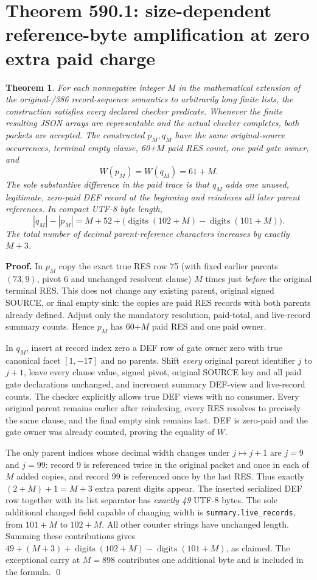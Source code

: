 \documentclass[11pt]{article}
\newtheorem{theorem}{Theorem}
\begin{document}
\section*{Theorem 590.1: size-dependent reference-byte amplification at zero extra paid charge}
\begin{theorem}
For each nonnegative integer $M$ in the mathematical extension of the original-/386 record-sequence semantics to arbitrarily long finite lists, the construction satisfies every declared checker predicate. Whenever the finite resulting JSON arrays are representable and the actual checker completes, both packets are accepted. The constructed $p_M,q_M$ have the same original-source occurrences, terminal empty clause, 60+$M$ paid RES count, one paid gate owner, and
\[
W(p_M)=W(q_M)=61+M.
\]
The sole substantive difference in the paid trace is that $q_M$ adds one \emph{unused, legitimate, zero-paid} DEF record at the beginning and reindexes all later parent references. In compact UTF-8 byte length,
\[
\boxed{
|q_M|-|p_M|=M+52+
\bigl(\operatorname{digits}(102+M)-\operatorname{digits}(101+M)\bigr).
}
\]
The total number of decimal parent-reference characters increases by exactly $M+3$.
\end{theorem}
\noindent\textbf{Proof.}
In $p_M$ copy the exact true RES row 75 (with fixed earlier parents $(73,9)$, pivot 6 and unchanged resolvent clause) $M$ times just \emph{before} the original terminal RES. This does not change any existing parent, original signed SOURCE, or final empty sink: the copies are paid RES records with both parents already defined. Adjust only the mandatory resolution, paid-total, and live-record summary counts. Hence $p_M$ has 60+$M$ paid RES and one paid owner.

In $q_M$, insert at record index zero a DEF row of gate owner zero with true canonical facet $[1,-17]$ and no parents. Shift \emph{every} original parent identifier $j$ to $j+1$, leave every clause value, signed pivot, original SOURCE key and all paid gate declarations unchanged, and increment summary DEF-view and live-record counts. The checker explicitly allows true DEF views with no consumer. Every original parent remains earlier after reindexing, every RES resolves to precisely the same clause, and the final empty sink remains last. DEF is zero-paid and the gate owner was already counted, proving the equality of $W$.

The only parent indices whose decimal width changes under $j\mapsto j+1$ are $j=9$ and $j=99$: record 9 is referenced twice in the original packet and once in each of $M$ added copies, and record 99 is referenced once by the last RES. Thus exactly $(2+M)+1=M+3$ extra parent digits appear. The inserted serialized DEF row together with its list separator has \emph{exactly 49} UTF-8 bytes. The sole additional changed field capable of changing width is \texttt{summary.live\_records}, from $101+M$ to $102+M$. All other counter strings have unchanged length. Summing these contributions gives $49+(M+3)+\operatorname{digits}(102+M)-\operatorname{digits}(101+M)$, as claimed. The exceptional carry at $M=898$ contributes one additional byte and is included in the formula. \qed
\end{document}
